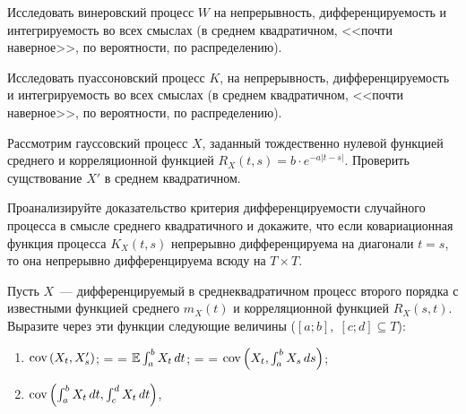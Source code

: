 \documentclass[12pt]{article}
\makeatletter
\newcommand{\inlineitem}[1][]
{%
    \ifnum\enit@type=\tw@
        {\descriptionlabel{#1}}
        \hspace{\labelsep}%
    \else
        \ifnum\enit@type=\z@
        \refstepcounter{\@listctr}\fi
        \quad\@itemlabel\hspace{\labelsep}%
\fi}
\renewcommand{\alph}[1]{\asbuk{#1}}
\def\canon{\textbf{(каноническое задание)}}
\makeatother
\begin{document}
\newpage




\begin{exercise}[subtitle={\canon}]
    Исследовать винеровский процесс $ W $ на непрерывность, дифференцируемость и интегрируемость во всех смыслах
    (в среднем квадратичном, <<почти наверное>>, по вероятности, по распределению).
\end{exercise}


\begin{exercise}[subtitle={\canon}]
    Исследовать пуассоновский процесс $ K $, на непрерывность, дифференцируемость и интегрируемость во всех смыслах
    (в среднем квадратичном, <<почти наверное>>, по вероятности, по распределению).
\end{exercise}


\begin{exercise}
    Рассмотрим гауссовский процесс $ X $,
    заданный тождественно нулевой функцией среднего и корреляционной функцией $ R_X(t, s) = b \cdot e^{-a|t - s|} $.
    Проверить сущствование $ X' $ в среднем квадратичном.
\end{exercise}


\begin{exercise}
    Проанализируйте доказательство критерия дифференцируемости случайного процесса в смысле среднего квадратичного и докажите,
    что если ковариационная функция процесса $ K_X(t, s) $ непрерывно дифференцируема на диагонали $ t = s $,
    то она непрерывно дифференцируема всюду на $ T \times T $.
\end{exercise}


\begin{exercise}
    Пусть $ X $~--- дифференцируемый в среднеквадратичном процесс второго порядка
    с известными функцией среднего $ m_X(t) $ и корреляционной функцией $ R_X(s, t) $.
    Выразите через эти функции следующие величины ($ [a; b], \; [c; d] \subseteq T $):
    \begin{enumerate}[label=\textbf{\alph*)}]
        \item
            $ \textnormal{cov}\left(X_t, X_s'\right) $;
        \inlineitem
            $ \operatorname{\mathbb{E}} \int_a^b X_t \, dt $;
        \inlineitem
            $ \textnormal{cov}\left(X_t, \int_a^b X_s \, ds\right) $;
        \item
        $ \textnormal{cov}\left(\int_a^b X_t \, dt, \int_c^d X_t \, dt\right) $,
    \end{enumerate}
\end{exercise}
\end{document}
